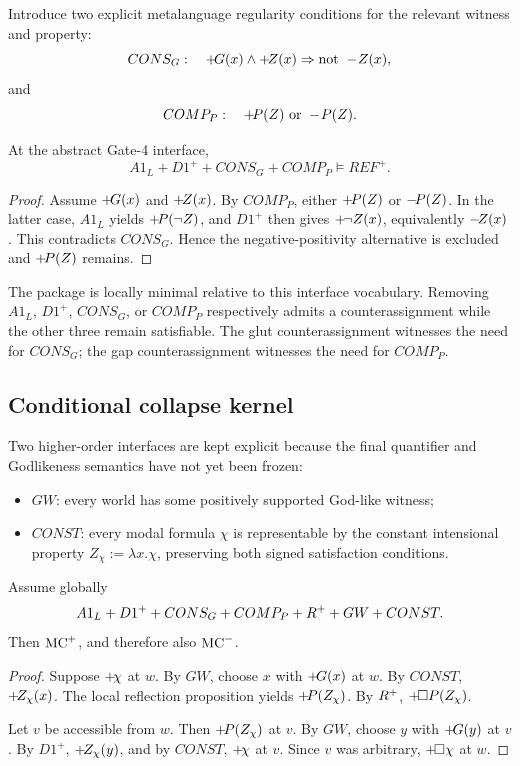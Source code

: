 Introduce two explicit metalanguage regularity conditions for the relevant witness and property:
\[
  CONS_G:\quad
  +\!G(x)\land+\!Z(x)
  \Rightarrow
  \text{not }-\!Z(x),
\]
and
\[
  COMP_P:\quad
  +\!P(Z)\ \text{or}\ -\!P(Z).
\]

\begin{proposition}
At the abstract Gate-4 interface,
\[
  A1_L+D1^++CONS_G+COMP_P\models REF^+.
\]
\end{proposition}
\begin{proof}
Assume \(+\!G(x)\) and \(+\!Z(x)\). By \(COMP_P\), either \(+\!P(Z)\) or \(-\!P(Z)\). In the latter case, \(A1_L\) yields \(+\!P(\neg Z)\), and \(D1^+\) then gives \(+\!\neg Z(x)\), equivalently \(-\!Z(x)\). This contradicts \(CONS_G\). Hence the negative-positivity alternative is excluded and \(+\!P(Z)\) remains.
\end{proof}

The package is locally minimal relative to this interface vocabulary. Removing \(A1_L\), \(D1^+\), \(CONS_G\), or \(COMP_P\) respectively admits a counterassignment while the other three remain satisfiable. The glut counterassignment witnesses the need for \(CONS_G\); the gap counterassignment witnesses the need for \(COMP_P\).

\subsection{Conditional collapse kernel}

Two higher-order interfaces are kept explicit because the final quantifier and Godlikeness semantics have not yet been frozen:

\begin{itemize}
  \item \(GW\): every world has some positively supported God-like witness;
  \item \(CONST\): every modal formula \(\chi\) is representable by the constant intensional property \(Z_\chi:=\lambda x.\chi\), preserving both signed satisfaction conditions.
\end{itemize}

\begin{theorem}
Assume globally
\[
  A1_L+D1^++CONS_G+COMP_P+R^{+}+GW+CONST.
\]
Then \(\mathrm{MC}^{+}\), and therefore also \(\mathrm{MC}^{-}\).
\end{theorem}
\begin{proof}
Suppose \(+\!\chi\) at \(w\). By \(GW\), choose \(x\) with \(+\!G(x)\) at \(w\). By \(CONST\), \(+\!Z_\chi(x)\). The local reflection proposition yields \(+\!P(Z_\chi)\). By \(R^{+}\), \(+\!\Box P(Z_\chi)\).

Let \(v\) be accessible from \(w\). Then \(+\!P(Z_\chi)\) at \(v\). By \(GW\), choose \(y\) with \(+\!G(y)\) at \(v\). By \(D1^+\), \(+\!Z_\chi(y)\), and by \(CONST\), \(+\!\chi\) at \(v\). Since \(v\) was arbitrary, \(+\!\Box\chi\) at \(w\).
\end{proof}

